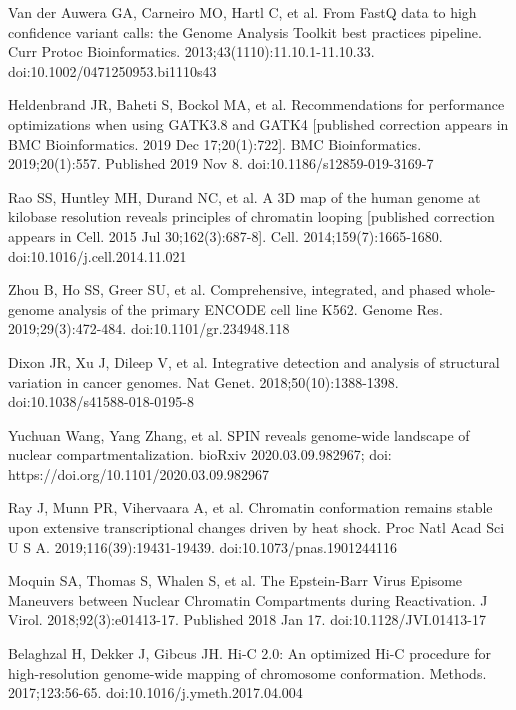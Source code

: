 \documentclass[a4paper,12pt]{article}
\begin{document}
\begin{thebibliography}{100}


Van der Auwera GA, Carneiro MO, Hartl C, et al. From FastQ data to high confidence variant calls: the Genome Analysis Toolkit best practices pipeline. Curr Protoc Bioinformatics. 2013;43(1110):11.10.1-11.10.33. doi:10.1002/0471250953.bi1110s43

Heldenbrand JR, Baheti S, Bockol MA, et al. Recommendations for performance optimizations when using GATK3.8 and GATK4 [published correction appears in BMC Bioinformatics. 2019 Dec 17;20(1):722]. BMC Bioinformatics. 2019;20(1):557. Published 2019 Nov 8. doi:10.1186/s12859-019-3169-7


Rao SS, Huntley MH, Durand NC, et al. A 3D map of the human genome at kilobase resolution reveals principles of chromatin looping [published correction appears in Cell. 2015 Jul 30;162(3):687-8]. Cell. 2014;159(7):1665-1680. doi:10.1016/j.cell.2014.11.021

Zhou B, Ho SS, Greer SU, et al. Comprehensive, integrated, and phased whole-genome analysis of the primary ENCODE cell line K562. Genome Res. 2019;29(3):472-484. doi:10.1101/gr.234948.118

Dixon JR, Xu J, Dileep V, et al. Integrative detection and analysis of structural variation in cancer genomes. Nat Genet. 2018;50(10):1388-1398. doi:10.1038/s41588-018-0195-8

Yuchuan Wang, Yang Zhang, et al. SPIN reveals genome-wide landscape of nuclear compartmentalization. bioRxiv 2020.03.09.982967; doi: https://doi.org/10.1101/2020.03.09.982967

Ray J, Munn PR, Vihervaara A, et al. Chromatin conformation remains stable upon extensive transcriptional changes driven by heat shock. Proc Natl Acad Sci U S A. 2019;116(39):19431-19439. doi:10.1073/pnas.1901244116

Moquin SA, Thomas S, Whalen S, et al. The Epstein-Barr Virus Episome Maneuvers between Nuclear Chromatin Compartments during Reactivation. J Virol. 2018;92(3):e01413-17. Published 2018 Jan 17. doi:10.1128/JVI.01413-17

Belaghzal H, Dekker J, Gibcus JH. Hi-C 2.0: An optimized Hi-C procedure for high-resolution genome-wide mapping of chromosome conformation. Methods. 2017;123:56-65. doi:10.1016/j.ymeth.2017.04.004


\end{thebibliography}
\end{document}
